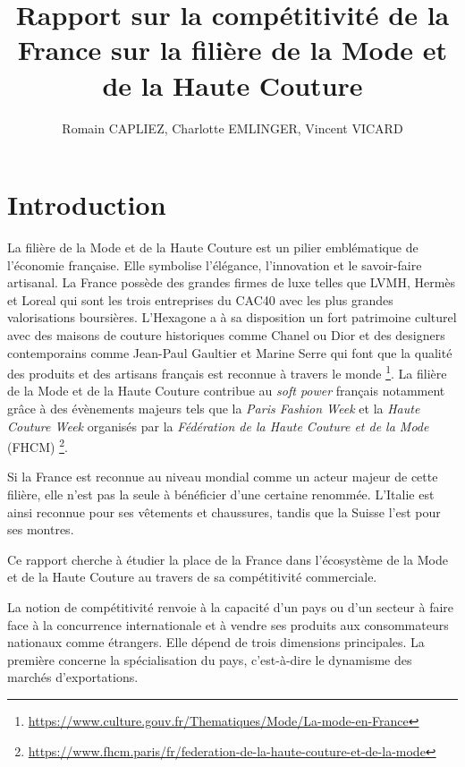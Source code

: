 \documentclass[french,10pt,a4paper]{article}
\title{Rapport sur la compétitivité de la France sur la filière de la Mode et de la Haute Couture}
\author{Romain CAPLIEZ, Charlotte EMLINGER, Vincent VICARD}
\begin{document}
\maketitle

\newpage
{}
\tableofcontents
{}

\newpage

\section{Introduction}

La filière de la Mode et de la Haute Couture est un pilier emblématique de l'économie française. Elle symbolise l'élégance, l'innovation et le savoir-faire artisanal. La France possède des grandes firmes de luxe telles que LVMH, Hermès et Loreal qui sont les trois entreprises du CAC40 avec les plus grandes valorisations boursières. L'Hexagone a à sa disposition un fort patrimoine culturel avec des maisons de couture historiques comme Chanel ou Dior et des designers contemporains comme Jean-Paul Gaultier et Marine Serre qui font que la qualité des produits et des artisans français est reconnue à travers le monde \footnote{\href{https://www.culture.gouv.fr/Thematiques/Mode/La-mode-en-France}{https://www.culture.gouv.fr/Thematiques/Mode/La-mode-en-France}}. La filière de la Mode et de la Haute Couture contribue au \textit{soft power} français notamment grâce à des évènements majeurs tels que la \textit{Paris Fashion Week} et la \textit{Haute Couture Week} organisés par la \textit{Fédération de la Haute Couture et de la Mode} (FHCM) \footnote{\href{https://www.fhcm.paris/fr/federation-de-la-haute-couture-et-de-la-mode}{https://www.fhcm.paris/fr/federation-de-la-haute-couture-et-de-la-mode}}.

Si la France est reconnue au niveau mondial comme un acteur majeur de cette filière, elle n'est pas la seule à bénéficier d'une certaine renommée. L'Italie est ainsi reconnue pour ses vêtements et chaussures, tandis que la Suisse l'est pour ses montres.

\bigskip

Ce rapport cherche à étudier la place de la France dans l'écosystème de la Mode et de la Haute Couture au travers de sa compétitivité commerciale.

\bigskip

La notion de compétitivité renvoie à la capacité d'un pays ou d'un secteur à faire face à la concurrence internationale et à vendre ses produits aux consommateurs nationaux comme étrangers. Elle dépend de trois dimensions principales. La première concerne la spécialisation du pays, c'est-à-dire le dynamisme des marchés d'exportations.
\end{document}

